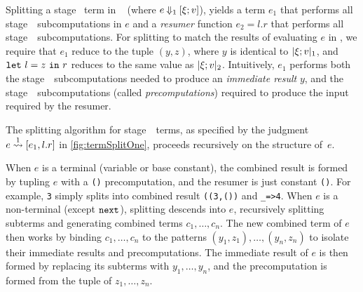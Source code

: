 




Splitting a stage \bbone\ term in \lang\
(where $e\mathbin{{\Downarrow_{ 1}}}[\xi;v]$), yields a term 
$e_1$ that performs all stage~\bbone\ subcomputations in $e$ and a \emph{resumer} function $e_2 = l.r$ that performs all stage~\bbtwo\ subcomputations.
For splitting to match the results of evaluating $e$ in \lang,
we require that $e_1$ reduce to the tuple $(y,z)$,
where $y$ is identical to $|\xi;v|_{ 1}$, and 
${\tt let}~{l} = {z}~{\tt in}~{r}$ reduces to the same value as $|\xi;v|_{ 2}$. Intuitively, $e_1$ performs both the stage~\bbone\ subcomputations needed to produce an \emph{immediate result} $y$, and the stage~\bbone\ subcomputations (called \emph{precomputations}) required to produce the input required by the resumer.

The splitting algorithm for stage~\bbone\ terms, as specified by the
judgment $e \overset{ 1}\rightsquigarrow [e_1,l.r]$ in \cref{fig:termSplitOne}, proceeds
recursively on the structure of~$e$.  

When $e$ is a terminal (variable or base constant), the combined result
is formed by tupling $e$ with a \texttt{()} precomputation, 
and the resumer is just constant \texttt{()}.  
For example, \texttt{3} simply splits into combined result \texttt{((3,())} and \texttt{\_=>4}.
When $e$ is a non-terminal (except ${\tt next}$),
splitting descends into $e$, recursively splitting subterms
and generating combined terms $c_1,\ldots,c_n$.
The new combined term of $e$ then works by binding $c_1,\ldots,c_n$
to the patterns $(y_1,z_1),\ldots,(y_n,z_n)$
to isolate their immediate results and precomputations.
The immediate result of $e$ is then formed by replacing its subterms with $y_1,\ldots,y_n$, 
and the precomputation is formed from the tuple of $z_1,\ldots,z_n$.

